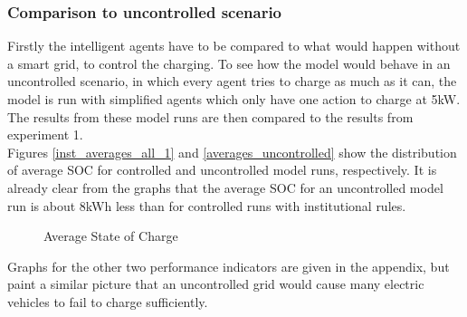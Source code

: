 \documentclass[a4paper]{article}
\begin{document}
\subsubsection{Comparison to uncontrolled scenario}
Firstly the intelligent agents have to be compared to what would happen without a smart grid, to control the charging. 
To see how the model would behave in an uncontrolled scenario, in which every agent tries to charge as much as it can, the model 
is run with simplified agents which only have one action to charge at 5kW. The results from these model runs are then compared to the 
results from experiment 1.\\
Figures \ref{inst_averages_all_1} and \ref{averages_uncontrolled} show the distribution of 
average SOC for controlled and uncontrolled model runs, respectively. It is already clear from the graphs that the average 
SOC for an uncontrolled model run is about 8kWh less than for controlled runs with institutional rules.  \\
\begin{figure}[!ht]
\caption{Average State of Charge}
\label{averages_unconstrained_a}
\end{figure}
Graphs for the other two performance indicators are given in the appendix, but paint a similar picture that an uncontrolled grid would 
cause many electric vehicles to fail to charge sufficiently. 
\newpage
\end{document}
